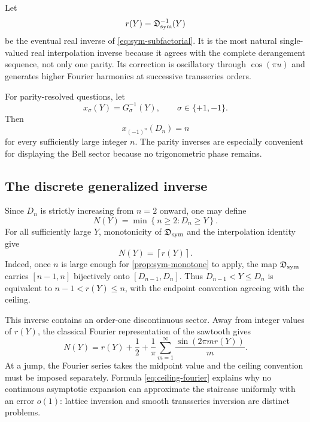\documentclass[11pt]{article}
\numberwithin{equation}{section}
\theoremstyle{mainthm}
\theoremstyle{defstyle}
\theoremstyle{remark}
\newcommand{\Dsub}{\mathfrak D}
\newcommand{\ceil}[1]{\left\lceil #1\right\rceil}
\newcommand{\set}[1]{\left\{#1\right\}}
\begin{document}
Let
\begin{equation}\label{eq:real-inverse-r}
 r(Y)=\Dsub_{\rm sym}^{-1}(Y)
\end{equation}
be the eventual real inverse of \cref{eq:sym-subfactorial}.  It is the most natural single-valued real interpolation inverse because it agrees with the complete derangement sequence, not only one parity.  Its correction is oscillatory through \(\cos(\pi u)\) and generates higher Fourier harmonics at successive transseries orders.

For parity-resolved questions, let
\begin{equation}\label{eq:parity-inverse}
 x_\sigma(Y)=G_\sigma^{-1}(Y),\qquad \sigma\in\{+1,-1\}.
\end{equation}
Then
\begin{equation}\label{eq:parity-exact-lattice}
 x_{(-1)^n}(D_n)=n
\end{equation}
for every sufficiently large integer \(n\).  The parity inverses are especially convenient for displaying the Bell sector because no trigonometric phase remains.

\subsection{The discrete generalized inverse}

Since \(D_n\) is strictly increasing from \(n=2\) onward, one may define
\begin{equation}\label{eq:discrete-inverse}
 N(Y)=\min\set{n\ge2:D_n\ge Y}.
\end{equation}
For all sufficiently large \(Y\), monotonicity of \(\Dsub_{\rm sym}\) and the interpolation identity give
\begin{equation}\label{eq:discrete-ceiling}
 \boxed{N(Y)=\ceil{r(Y)}.}
\end{equation}
Indeed, once \(n\) is large enough for \cref{prop:sym-monotone} to apply, the map \(\Dsub_{\rm sym}\) carries \([n-1,n]\) bijectively onto \([D_{n-1},D_n]\).  Thus \(D_{n-1}<Y\le D_n\) is equivalent to \(n-1<r(Y)\le n\), with the endpoint convention agreeing with the ceiling.

This inverse contains an order-one discontinuous sector.  Away from integer values of \(r(Y)\), the classical Fourier representation of the sawtooth gives
\begin{equation}\label{eq:ceiling-fourier}
 N(Y)=r(Y)+\frac12+\frac1\pi\sum_{m=1}^{\infty}
 \frac{\sin(2\pi m r(Y))}{m}.
\end{equation}
At a jump, the Fourier series takes the midpoint value and the ceiling convention must be imposed separately.  Formula \cref{eq:ceiling-fourier} explains why no continuous asymptotic expansion can approximate the staircase uniformly with an error \(o(1)\): lattice inversion and smooth transseries inversion are distinct problems.
\end{document}
